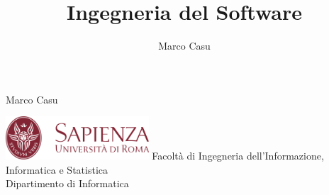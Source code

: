 \documentclass[10pt, letterpaper]{report}
\title{Ingegneria del Software} %
\author{Marco Casu}
\date{\vspace{-5ex}}
\begin{document}
\begin{titlepage}
    
\begin{center}
   \HUGE Marco Casu\acc
    \HUGE \decothreeleft\hphantom{ }{\HUGE\selectfont Ingegneria del Software}\hphantom{ }\decothreeright
\end{center}
\thispagestyle{empty}
\begin{figure}[h]
\end{figure}
\vfill 
\centering \includegraphics[width=0.4\textwidth ]{../../../preamble/Stemma_sapienza.png} \acc
\centering \Large \color{sapienza}Facoltà di Ingegneria dell'Informazione,
Informatica e Statistica\\
Dipartimento di Informatica
\end{titlepage}
\end{document}
